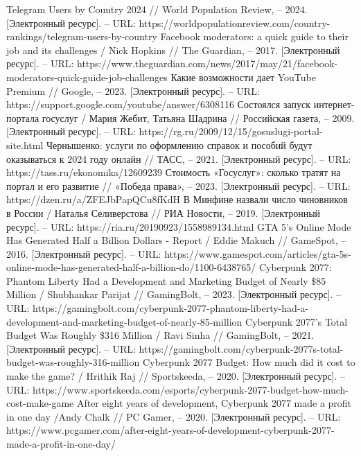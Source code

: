 \documentclass{article}
\begin{document}
\begin{thebibliography}{2}
 Telegram Users by Country 2024 // World Population Review, – 2024. [Электронный ресурс]. – URL: https://worldpopulationreview.com/country-rankings/telegram-users-by-country
 Facebook moderators: a quick guide to their job and its challenges / Nick Hopkins // The Guardian, – 2017. [Электронный ресурс]. – URL: https://www.theguardian.com/news/2017/may/21/facebook-moderators-quick-guide-job-challenges
 Какие возможности дает YouTube Premium // Google, – 2023. [Электронный ресурс]. – URL: https://support.google.com/youtube/answer/6308116
 Состоялся запуск интернет-портала госуслуг / Мария Жебит, Татьяна Шадрина // Российская газета, – 2009. [Электронный ресурс]. – URL: https://rg.ru/2009/12/15/gosuslugi-portal-site.html
 Чернышенко: услуги по оформлению справок и пособий будут оказываться к 2024 году онлайн // ТАСС, – 2021. [Электронный ресурс]. – URL: https://tass.ru/ekonomika/12609239
 Стоимость «Госуслуг»: сколько тратят на портал и его развитие // «Победа права», – 2023. [Электронный ресурс]. – URL: https://dzen.ru/a/ZFEJbPapQCu8fKdH
 В Минфине назвали число чиновников в России / Наталья Селиверстова // РИА Новости, – 2019. [Электронный ресурс]. – URL: https://ria.ru/20190923/1558989134.html
 GTA 5's Online Mode Has Generated Half a Billion Dollars - Report / Eddie Makuch // GameSpot, – 2016. [Электронный ресурс]. – URL: https://www.gamespot.com/articles/gta-5s-online-mode-has-generated-half-a-billion-do/1100-6438765/
 Cyberpunk 2077: Phantom Liberty Had a Development and Marketing Budget of Nearly \$85 Million / Shubhankar Parijat // GamingBolt, – 2023. [Электронный ресурс]. – URL: https://gamingbolt.com/cyberpunk-2077-phantom-liberty-had-a-development-and-marketing-budget-of-nearly-85-million
 Cyberpunk 2077’s Total Budget Was Roughly \$316 Million / Ravi Sinha // GamingBolt, – 2021. [Электронный ресурс]. – URL: https://gamingbolt.com/cyberpunk-2077s-total-budget-was-roughly-316-million
 Cyberpunk 2077 Budget: How much did it cost to make the game? / Hrithik Raj // Sportskeeda, – 2020. [Электронный ресурс]. – URL: https://www.sportskeeda.com/esports/cyberpunk-2077-budget-how-much-cost-make-game
 After eight years of development, Cyberpunk 2077 made a profit in one day /Andy Chalk // PC Gamer, – 2020. [Электронный ресурс]. – URL: https://www.pcgamer.com/after-eight-years-of-development-cyberpunk-2077-made-a-profit-in-one-day/

\end{thebibliography}
\end{document}
